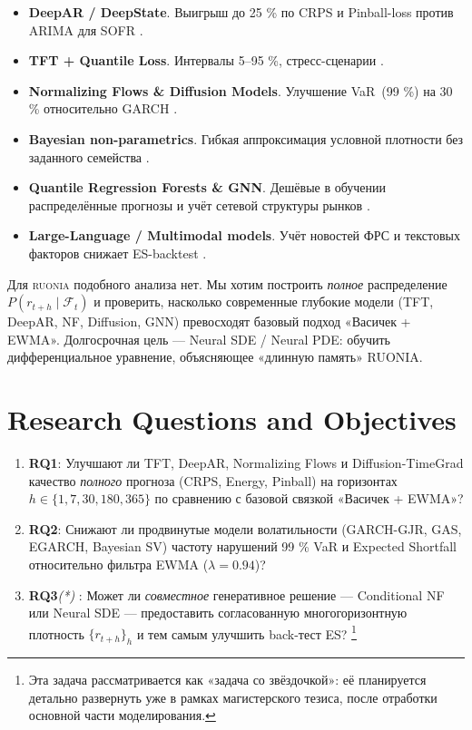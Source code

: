 \begin{itemize}
  \item \textbf{DeepAR / DeepState}.  Выигрыш до 25 \% по CRPS и
        Pinball-loss против ARIMA для SOFR \autocite{salinas2020deepar}.
  \item \textbf{TFT + Quantile Loss}.  Интервалы 5–95 \%, стресс-сценарии
         \autocite{lim2024tft,vaswani2024transformers}.
  \item \textbf{Normalizing Flows \& Diffusion Models}.  Улучшение
        VaR~(99 \%) на 30 \% относительно GARCH
        \autocite{rasouli2023flows,zangeneh2024diffusion,xu2024deep}.
  \item \textbf{Bayesian non-parametrics}.  Гибкая аппроксимация
        условной плотности без заданного семейства
        \autocite{alvarez2024bayesian}.
  \item \textbf{Quantile Regression Forests \& GNN}.  Дешёвые в
        обучении распределённые прогнозы и учёт сетевой структуры
        рынков \autocite{liu2024robust,hayashi2024graphnets}.
  \item \textbf{Large-Language / Multimodal models}.  Учёт новостей
        ФРС и текстовых факторов снижает ES-backtest
        \autocite{gao2024fedspeak,silva2024multimodal,chang2024forecasting}.
\end{itemize}

Для \textsc{ruonia} подобного анализа нет.  
Мы хотим построить \emph{полное} распределение
\(P(r_{t+h}\mid\mathcal F_t)\) и проверить, насколько современные
глубокие модели (TFT, DeepAR, NF, Diffusion, GNN) превосходят
базовый подход «Васичек + EWMA».  
Долгосрочная цель — Neural SDE / Neural PDE: обучить
дифференциальное уравнение, объясняющее «длинную память» RUONIA.

\section{Research Questions and Objectives}

\begin{enumerate}
  \item \textbf{RQ1}: Улучшают ли TFT, DeepAR, Normalizing Flows и
        Diffusion-TimeGrad качество \emph{полного} прогноза
        (CRPS, Energy, Pinball) на горизонтах
        \(h \in \{1,7,30,180,365\}\)
        по сравнению с базовой связкой «Васичек + EWMA»?
  \item \textbf{RQ2}: Снижают ли продвинутые модели волатильности
        (GARCH-GJR, GAS, EGARCH, Bayesian SV) частоту нарушений
        99 \% VaR и Expected Shortfall
        относительно фильтра EWMA (\(\lambda=0.94\))?
  \item \textbf{RQ3}\emph{(*)} : Может ли \emph{совместное} генеративное решение
        — Conditional NF или Neural SDE — предоставить согласованную
        многогоризонтную плотность \(\{r_{t+h}\}_{h}\) и тем самым
        улучшить back-тест ES? \footnote{ 
        Эта задача рассматривается как «задача со звёздочкой»:
        её планируется детально развернуть уже в рамках магистерского
        тезиса, после отработки основной части моделирования.}
\end{enumerate}

